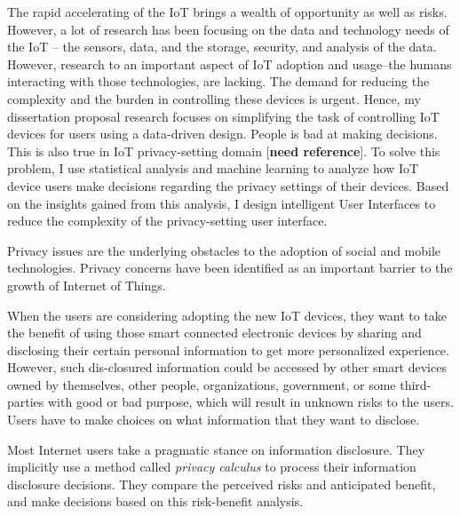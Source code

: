 The rapid accelerating of the IoT brings a wealth of opportunity as well as risks. However, a lot of research has been focusing on the data and technology needs of the IoT -- the sensors, data, and the storage, security, and analysis of the data. However, research to an important aspect of IoT adoption and usage--the humans interacting with those technologies, are lacking. The demand for reducing the complexity and the burden in controlling these devices is urgent. Hence, my dissertation proposal research focuses on simplifying the task of controlling IoT devices for users using a data-driven design. People is bad at making decisions. This is also true in IoT privacy-setting domain [\textbf{need reference}]. To solve this problem, I use statistical analysis and machine learning to analyze how IoT device users make decisions regarding the privacy settings of their devices. Based on the insights gained from this analysis, I design intelligent User Interfaces to reduce the complexity of the privacy-setting user interface.

Privacy issues are the underlying obstacles to the adoption of social and mobile technologies. Privacy concerns have been identified as an important barrier to the growth of Internet of Things. 

When the users are considering adopting the new IoT devices, they want to take the benefit of using those smart connected electronic devices by sharing and disclosing their certain personal information to get more personalized experience. However, such dis-closured information could be accessed by other smart devices owned by themselves, other people, organizations, government, or some third-parties with good or bad purpose, which will result in unknown risks to the users. Users have to make choices on what information that they want to disclose.

Most Internet users take a pragmatic stance on information disclosure. They implicitly use a method called \textit{privacy calculus} to process their information disclosure decisions. They compare the perceived risks and anticipated benefit, and make decisions based on this risk-benefit analysis.

